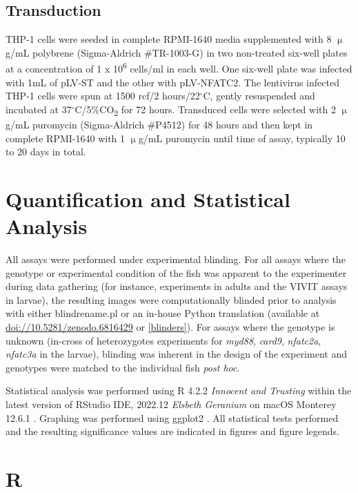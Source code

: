 \subsection{Transduction}\label{transduction}

THP\hyp{}1 cells were seeded in complete RPMI\hyp{}1640 media supplemented with 8 $\upmu$g/mL polybrene (Sigma\hyp{}Aldrich \#TR\hyp{}1003\hyp{}G) in two non\hyp{}treated six\hyp{}well plates at a concentration of 1 x 10\textsuperscript{6} cells/ml in each well. One six\hyp{}well plate was infected with 1mL of pLV\hyp{}ST and the other with pLV\hyp{}NFATC2. The lentivirus infected THP\hyp{}1 cells were spun at 1500 rcf/2 hours/22$^{\circ}$C, gently resuspended and incubated at 37$^{\circ}$C/5\%CO\textsubscript{2} for 72 hours. Transduced cells were selected with 2 $\upmu$g/mL puromycin (Sigma\hyp{}Aldrich \#P4512) for 48 hours and then kept in complete RPMI\hyp{}1640 with 1 $\upmu$g/mL puromycin until time of assay, typically 10 to 20 days in total.

\section{Quantification and Statistical Analysis}\label{quant:stats}

All assays were performed under experimental blinding. For all assays where the genotype or experimental condition of the fish was apparent to the experimenter during data gathering (for instance, experiments in adults and the VIVIT assays in larvae), the resulting images were computationally blinded prior to analysis with either blindrename.pl \citep{Salter2016} or an in\hyp{}house Python translation (available at \url{doi://10.5281/zenodo.6816429} or \autoref{blinders}). For assays where the genotype is unknown (in\hyp{}cross of heterozygotes experiments for \textit{myd88}, \textit{card9}, \textit{nfatc2a}, \textit{nfatc3a} in the larvae), blinding was inherent in the design of the experiment and genotypes were matched to the individual fish \textit{post hoc}. 

Statistical analysis was performed using R 4.2.2 \textit{Innocent and Trusting} within the latest version of RStudio IDE, 2022.12 \textit{Elsbeth Geranium} on macOS Monterey 12.6.1 \citep{RCoreTeam2022, RStudioTeam2022}. Graphing was performed using ggplot2 \citep{Wickham2016, Wickham2022b}. All statistical tests performed and the resulting significance values are indicated in figures and figure legends.

\section{R}\label{meth:R}

